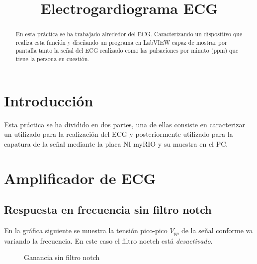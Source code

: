 \documentclass[conference]{IEEEtran}
\begin{document}
\graphicspath{{./figures/}}

\title{Electrogardiograma ECG}

\author{
\and
{}
}

\maketitle

\begin{abstract}
En esta práctica se ha trabajado alrededor del ECG. Caracterizando un dispositivo que realiza esta función y diseñando un programa en LabVIEW capaz de mostrar por pantalla tanto la señal del ECG realizado como las pulsaciones por minuto (ppm) que tiene la persona en cuestión.
\end{abstract}

\section{Introducción}
Esta práctica se ha dividido en dos partes, una de ellas consiste en caracterizar un utilizado para la realización del ECG y posteriormente utilizado para la capatura de la señal mediante la placa NI myRIO y su muestra en el PC.

\section{Amplificador de ECG}
\subsection{Respuesta en frecuencia sin filtro notch}
En la gráfica siguiente se muestra la tensión pico-pico $V_{pp}$ de la señal conforme va variando la frecuencia. En este caso el filtro noctch está \textit{desactivado}.

\begin{figure}[H]
    \caption{Ganancia sin filtro notch}
    \label{g_sinNotch}
    \end{figure}
\end{document}
